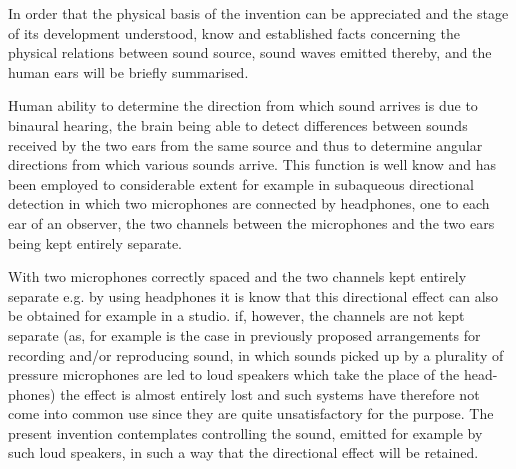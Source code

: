 \documentclass[11pt]{article}
\begin{document}
\begin{multicols*}{2}
In order that the physical basis of the invention can be appreciated and the stage of its development understood, know and established facts concerning the physical relations between sound source, sound waves emitted thereby, and the human ears will be briefly summarised.

Human ability to determine the direction from which sound arrives is due to binaural hearing, the brain being able to detect differences between sounds received by the two ears from the same source and thus to determine angular directions from which various sounds arrive. This function is well know and has been employed to considerable extent for example in subaqueous directional detection in which two microphones are connected by headphones, one to each ear of an observer, the two channels between the microphones and the two ears being kept entirely separate.

With two microphones correctly spaced and the two channels kept entirely separate e.g. by using headphones it is know that this directional effect can also be obtained for example in a studio. if, however, the channels are not kept separate (as, for example is the case in previously proposed arrangements for recording and/or reproducing sound, in which sounds picked up by a plurality of pressure microphones are led to loud speakers which take the place of the head-phones) the effect is almost entirely lost and such systems have therefore not come into common use since they are quite unsatisfactory for the purpose. The present invention contemplates controlling the sound, emitted for example by such loud speakers, in such a way that the directional effect will be retained.


\end{multicols*}
\end{document}
